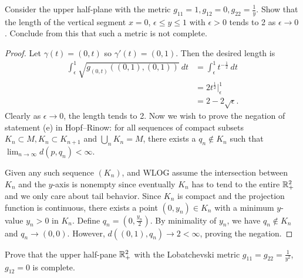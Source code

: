 \documentclass[12pt]{article}
\begin{document}
\begin{problem}[7.9]
Consider the upper half-plane with the metric  $ g_{11} = 1, g_{12}=0, g_{22} = \frac{1}{y}$. Show that the length of the vertical segment $ x=0$,  $ \epsilon\leq y \leq 1$ with $ \epsilon>0$ tends to 2 as $ \epsilon \to 0$. Conclude from this that such a metric is not complete.
\end{problem}
\begin{proof}
Let $ \gamma(t) = (0,t)$ so $ \gamma'(t) = (0,1)$. Then the desired length is
\begin{align*}
	\int_{ \epsilon}^{ 1} \sqrt{g_{(0,t)} ((0,1),(0,1))}\ dt  &= \int_{ \epsilon}^{ 1} t^{-\frac{1}{2}} \ dt  \\
	&= 2 t^{\frac{1}{2}} \big|_{ \epsilon}^{1} \\
	&= 2- 2 \sqrt{ \epsilon}  .
\end{align*}
Clearly as $ \epsilon \to 0$, the length tends to 2. Now we wish to prove the negation of statement (e) in Hopf--Rinow: for all sequences of compact subsets $ K_n \subset M, K_n \subset K_{n+1} $ and $ \bigcup_{ n} K_n =M $, there exists a $ q_n \not\in K_n$ such that $ \lim_{ n \to \infty}  d(p,q_n) < \infty $.

Given any such sequence $ (K_n) $, and WLOG assume the intersection between $ K_n$ and the $ y$-axis is nonempty since eventually  $ K_n$ has to tend to the entire $ \mathbb{R}_+^2$ and we only care about tail behavior.  Since $ K_n$ is compact and the projection function is continuous, there exists a point $ (0,y_n) \in K_n $ with a minimum  $ y$-value  $ y_n > 0$ in $ K_n$. Define  $ q_n = \left(0, \frac{y_n}{ 2}\right)$. By minimality of $ y_n$, we have $ q_n \not\in K_n$ and $ q_n \to (0,0)$. However, $ d((0,1),q_n) \to 2 < \infty$, proving the negation. 
\end{proof}
\begin{problem}[7.10]
Prove that the upper half-pane $ \mathbb{R}_+^2$ with the Lobatchevski metric $ g_{11}= g_{22} = \frac{1}{y^2}$, $ g_{12} = 0 $ is complete.
\end{problem}
\end{document}

